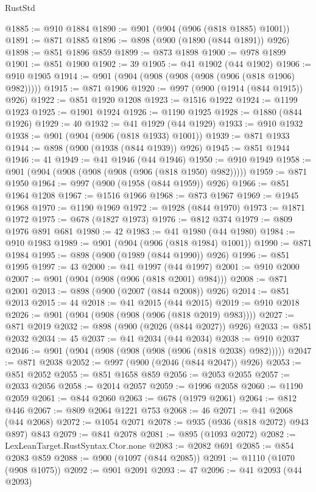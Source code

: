 \begin{lexlean}{RustStd}
\begin{coremodule}
@1885 := @910 @1884
@1890 := @901 (@904 (@906 (@818 @1885) @1001))
@1891 := @871 @1885
@1896 := @898 (@900 (@1890 (@844 @1891)) @926)
@1898 := @851 @1896 @859
@1899 := @873 @1898
@1900 := @978 @1899
@1901 := @851 @1900
@1902 := 39
@1905 := @41 @1902 (@44 @1902)
@1906 := @910 @1905
@1914 := @901 (@904 (@908 (@908 (@908 (@906 (@818 @1906) @982)))))
@1915 := @871 @1906
@1920 := @997 (@900 (@1914 (@844 @1915)) @926)
@1922 := @851 @1920 @1208
@1923 := @1516 @1922
@1924 := @1199 @1923
@1925 := @1901 @1924
@1926 := @1190 @1925
@1928 := @1880 (@844 @1926)
@1929 := 40
@1932 := @41 @1929 (@44 @1929)
@1933 := @910 @1932
@1938 := @901 (@904 (@906 (@818 @1933) @1001))
@1939 := @871 @1933
@1944 := @898 (@900 (@1938 (@844 @1939)) @926)
@1945 := @851 @1944
@1946 := 41
@1949 := @41 @1946 (@44 @1946)
@1950 := @910 @1949
@1958 := @901 (@904 (@908 (@908 (@908 (@906 (@818 @1950) @982)))))
@1959 := @871 @1950
@1964 := @997 (@900 (@1958 (@844 @1959)) @926)
@1966 := @851 @1964 @1208
@1967 := @1516 @1966
@1968 := @873 @1967
@1969 := @1945 @1968
@1970 := @1190 @1969
@1972 := @1928 (@844 @1970)
@1973 := @1871 @1972
@1975 := @678 (@1827 @1973)
@1976 := @812 @374
@1979 := @809 @1976 @891 @681
@1980 := 42
@1983 := @41 @1980 (@44 @1980)
@1984 := @910 @1983
@1989 := @901 (@904 (@906 (@818 @1984) @1001))
@1990 := @871 @1984
@1995 := @898 (@900 (@1989 (@844 @1990)) @926)
@1996 := @851 @1995
@1997 := 43
@2000 := @41 @1997 (@44 @1997)
@2001 := @910 @2000
@2007 := @901 (@904 (@908 (@906 (@818 @2001) @984)))
@2008 := @871 @2001
@2013 := @898 (@900 (@2007 (@844 @2008)) @926)
@2014 := @851 @2013
@2015 := 44
@2018 := @41 @2015 (@44 @2015)
@2019 := @910 @2018
@2026 := @901 (@904 (@908 (@908 (@906 (@818 @2019) @983))))
@2027 := @871 @2019
@2032 := @898 (@900 (@2026 (@844 @2027)) @926)
@2033 := @851 @2032
@2034 := 45
@2037 := @41 @2034 (@44 @2034)
@2038 := @910 @2037
@2046 := @901 (@904 (@908 (@908 (@908 (@906 (@818 @2038) @982)))))
@2047 := @871 @2038
@2052 := @997 (@900 (@2046 (@844 @2047)) @926)
@2053 := @851 @2052
@2055 := @851 @1658 @859
@2056 := @2053 @2055
@2057 := @2033 @2056
@2058 := @2014 @2057
@2059 := @1996 @2058
@2060 := @1190 @2059
@2061 := @844 @2060
@2063 := @678 (@1979 @2061)
@2064 := @812 @446
@2067 := @809 @2064 @1221 @753
@2068 := 46
@2071 := @41 @2068 (@44 @2068)
@2072 := @1054 @2071
@2078 := @935 (@936 (@818 @2072) @943 @897) @843
@2079 := @841 @2078
@2081 := @895 (@1093 @2072)
@2082 := LexLeanTarget.RustSyntax.Ctor.none
@2083 := @2082 @691
@2085 := @854 @2083 @859
@2088 := @900 (@1097 (@844 @2085))
@2091 := @1110 (@1070 (@908 @1075))
@2092 := @901 @2091
@2093 := 47
@2096 := @41 @2093 (@44 @2093)

\end{coremodule}
\end{lexlean}
